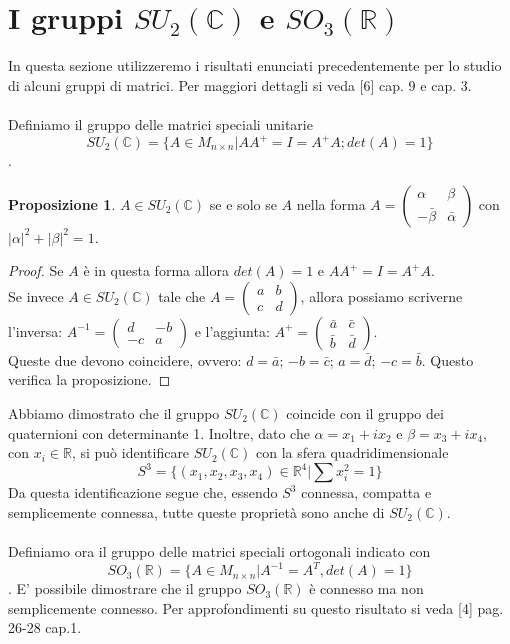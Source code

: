 \documentclass[12pt,a4paper]{report}
\theoremstyle{definition}
\theoremstyle{Theorem}
\newtheorem{Prop}[Def]{Proposizione}
\theoremstyle{definition}
\theoremstyle{definition}
\theoremstyle{definition}
\begin{document}
\section{I gruppi $SU_2(\mathbb{C})$ e $SO_3(\mathbb{R})$} 
In questa sezione utilizzeremo i risultati enunciati precedentemente per lo studio di alcuni gruppi di matrici. Per maggiori dettagli si veda [6] cap. 9 e cap. 3.\\
\\
Definiamo il gruppo delle matrici speciali unitarie $$SU_2(\mathbb{C})=\{A\in M_{n\times n}|AA^{+}=I=A^{+}A;det(A)=1\}$$.
\begin{Prop}
	$A\in SU_2(\mathbb{C})$ se e solo se $A$ nella forma $A=
	\begin{pmatrix}
		\alpha & \beta \\
		-\bar{\beta} & \bar{\alpha}
	\end{pmatrix}
	$ con $|\alpha|^2+|\beta|^2=1$.
\end{Prop}
\begin{proof}
	Se $A$ è in questa forma allora $det(A)=1$ e $AA^{+}=I=A^{+}A$.\\
	Se invece $A\in SU_2(\mathbb{C})$ tale che $A=
	\begin{pmatrix}
		a & b \\
		c & d
	\end{pmatrix}$, allora possiamo scriverne l'inversa:
$A^{-1}=\begin{pmatrix}
	d & -b \\
	-c & a
\end{pmatrix}$ e l'aggiunta: $A^+=
\begin{pmatrix}
	\bar{a} & \bar{c} \\
	\bar{b} & \bar{d}
\end{pmatrix}$.\\
Queste due devono coincidere, ovvero: $d=\bar{a}$; $-b=\bar{c}$; $a=\bar{d}$; $-c=\bar{b}$. Questo verifica la proposizione.
\end{proof}
Abbiamo dimostrato che il gruppo $SU_2(\mathbb{C})$ coincide con il gruppo dei quaternioni con determinante 1.
Inoltre, dato che $\alpha=x_1+ix_2$ e $\beta=x_3+ix_4$, con $x_i\in\mathbb{R}$, si può identificare $SU_2(\mathbb{C})$ con la sfera quadridimensionale $$S^3=\{(x_1,x_2,x_3,x_4)\in \mathbb{R}^4|\sum x_i^2=1\}$$
Da questa identificazione segue che, essendo $S^3$ connessa, compatta e semplicemente connessa, tutte queste proprietà sono anche di $SU_2(\mathbb{C})$.
\\\\
Definiamo ora il gruppo delle matrici speciali ortogonali indicato con $$SO_3(\mathbb{R})=\{A\in M_{n\times n}|A^{-1}=A^T, det(A)=1\}$$.
E' possibile dimostrare che il gruppo $SO_3(\mathbb{R})$ è connesso ma non semplicemente connesso. Per approfondimenti su questo risultato si veda [4] pag. 26-28 cap.1.
\end{document}
